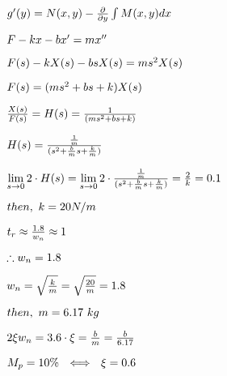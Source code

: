 \documentclass[draft, pdftex, a4paper, 12pt, openbib, ]{article}
\begin{document}
	






$  {g}'(y) = N(x,y) - \frac{\partial }{\partial y}\int M(x,y)dx      \\\\$



$   F - kx - bx' = mx''    \\\\$

$	F(s) -kX(s) - bsX(s) = ms^{2}X(s) \\\\ $


$  F(s) = (ms^{2} + bs + k ) X(s)     \\\\$


$	\frac{X(s)}{F(s)} = H(s) = \frac{1}{(ms^{2} + bs + k)} \\\\ $


$   H(s) = \frac{\frac{1}{m}}{(s^{2} + \frac{b}{m}s + \frac{k}{m})} \\\\ $


$   \lim\limits_{s \rightarrow 0} 2\cdot H(s) = \lim\limits_{s \rightarrow 0} 2\cdot \frac{\frac{1}{m}}{(s^{2} + \frac{b}{m}s + \frac{k}{m})} = \frac{2}{k} = 0.1   \\\\$ 


$   then, \  k = 20 N/m       \\\\$


$  t_{r} \approx \frac{1.8}{w_{n}} \approx 1      \\$


$  \therefore w_{n} = 1.8  \\$


$  w_{n} = \sqrt{\frac{k}{m}} = \sqrt{\frac{20}{m}}  = 1.8     \\$


$   then, \ m = 6.17 \ kg    \\$


$  2\xi w_{n} = 3.6\cdot\xi = \frac{b}{m} = \frac{b}{6.17}     \\$


$  M_{p} = 10\% \ \ \Longleftrightarrow \ \  \xi = 0.6   \\$
\end{document}
